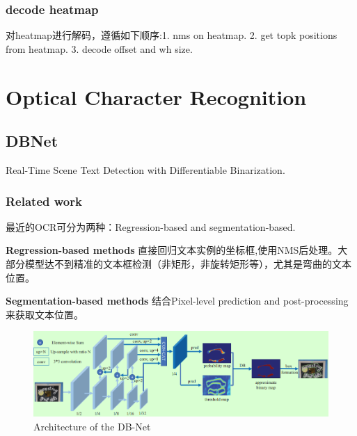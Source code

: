 \documentclass{article}
\begin{document}
\subsubsection{decode heatmap}
对heatmap进行解码，遵循如下顺序:1. nms on heatmap. 2. get topk positions from heatmap. 3. decode offset and wh size.

\section{Optical Character Recognition}
\subsection{DBNet}
Real-Time Scene Text Detection with Differentiable Binarization\cite{liao2020real}.
\subsubsection{Related work}
最近的OCR可分为两种：Regression-based and segmentation-based.

\textbf{Regression-based methods} 直接回归文本实例的坐标框,使用NMS后处理。大部分模型达不到精准的文本框检测（非矩形，非旋转矩形等），尤其是弯曲的文本位置。

\textbf{Segmentation-based methods} 结合Pixel-level prediction and post-processing 来获取文本位置。
\begin{figure}[htp!]
\centering
\includegraphics[scale=0.4]{images/dbnet.png}
\caption{Architecture of the DB-Net}
\label{Fig.dbnet}
\end{figure}
\end{document}
